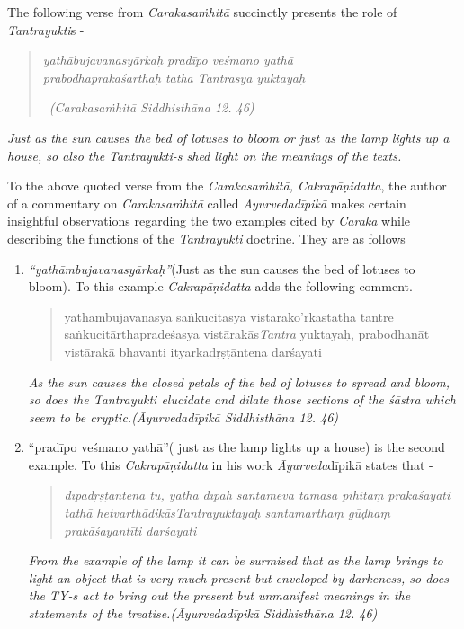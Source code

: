 The following verse from \textit{Carakasaṁhitā} succinctly presents the role of \textit{Tantrayukti}s -

\begin{verse}
\textit{yathābujavanasyārkaḥ pradīpo veśmano yathā}\\\textit{prabodhaprakāśārthāḥ tathā Tantrasya yuktayaḥ }

~\hfill \textit{(Carakasaṁhitā Siddhisthāna 12. 46)}
\end{verse}

\textit{Just as the sun causes the bed of lotuses to bloom or just as the lamp lights up a house, so also the Tantrayukti-s shed light on the meanings of the texts.}

\newpage

To the above quoted verse from the \textit{Carakasaṁhitā, Cakrapāṇidatta}, the author of a commentary on \textit{Carakasaṁhitā} called \textit{Āyurvedadīpikā} makes certain insightful observations regarding the two examples cited by \textit{Caraka} while describing the functions of the \textit{Tantrayukti} doctrine. They are as follows

\begin{enumerate}
\item 
 \textit{“yathāmbujavanasyārkaḥ”}(Just as the sun causes the bed of lotuses to bloom). To this example \textit{Cakrapāṇidatta} adds the following comment.

\begin{quote}
yathāmbujavanasya saṅkucitasya vistārako'rkastathā tantre saṅkucitārthapradeśasya vistārakās\textit{Tantra} yuktayaḥ, prabodhanāt vistārakā bhavanti ityarkadṛṣṭāntena darśayati
\end{quote}

\begin{myquote}
\textit{As the sun causes the closed petals of the bed of lotuses to spread and bloom, so does the Tantrayukti elucidate and dilate those sections of the śāstra which seem to be cryptic.}\hfill \textit{(Āyurvedadīpikā Siddhisthāna 12. 46)}
\end{myquote}


 \item 
 “pradīpo veśmano yathā”( just as the lamp lights up a house) is the second example. To this \textit{Cakrapāṇidatta} in his work \textit{Āyurveda}dīpikā states that -

\begin{quote}
\textit{dīpadṛṣṭāntena tu, yathā dīpaḥ santameva tamasā pihitaṃ prakāśayati tathā hetvarthādikāsTantrayuktayaḥ santa\-marthaṃ gūḍhaṃ prakāśayantīti darśayati}
\end{quote}

\begin{myquote}
\textit{From the example of the lamp it can be surmised that as the lamp brings to light an object that is very much present but enveloped by darkeness, so does the TY-s act to bring out the present but unmanifest meanings in the statements of the treatise.}\hfill \textit{(Āyurvedadīpikā Siddhisthāna 12. 46)}
\end{myquote}


\end{enumerate}

